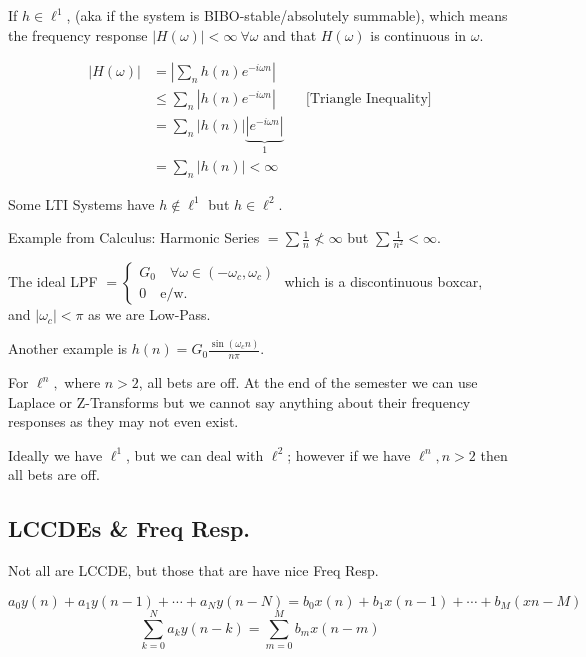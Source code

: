 If $h\in\ell^1$, (aka if the system is BIBO-stable/absolutely summable), which means the frequency response $|H(\omega)|<\infty\ \forall\omega$ and that $H(\omega)$ is continuous in $\omega$. 

\begin{align*}
    |H(\omega)| 
    &= |\sum_n h(n) e^{-i\omega n}|
    \\
    &\le \sum_n |h(n) e^{-i\omega n}|
    &&\text{[Triangle Inequality]}
    \\
    &= \sum_n |h(n)| \underbrace{|e^{-i\omega n}|}_1
    \\ 
    &= 
    \sum_n |h(n)| 
    <
    \infty
\end{align*}
    
    
Some LTI Systems have $h\not\in\ell^1$ but $h\in\ell^2$.

Example from Calculus: Harmonic Series $=\sum \frac1n\not<\infty$ but $\sum \frac1{n^2}<\infty$.

The ideal LPF $=\begin{cases}
G_0 \quad \forall \omega\in(-\omega_c, \omega_c)
\\
0 \quad \text{e/w}.
\end{cases}$
which is a discontinuous boxcar, \\
and $|\omega_c|<\pi$ as we are Low-Pass.

Another example is $h(n)=G_0\frac{\sin(\omega_c n)}{n\pi}$.

For $\ell^n,$ where $n > 2$, all bets are off. At the end of the semester we can use Laplace or Z-Transforms but we cannot say anything about their frequency responses as they may not even exist.

Ideally we have $\ell^1$, but we can deal with $\ell^2$; however if we have $\ell^n, n>2$ then all bets are off.

\subsection{LCCDEs \& Freq Resp.}
Not all are LCCDE, but those that are have nice Freq Resp.

\begin{equation*}
    a_0 y(n) + a_1 y(n - 1) + \cdots +  a_N y(n - N) 
    = b_0 x(n) + b_1 x(n-1) + \cdots + b_M (xn-M)
\end{equation*}
\begin{equation}\label{eq:3}
    \sum_{k=0}^N a_k y(n-k) = \sum_{m=0}^M b_m x(n-m)
\end{equation}

